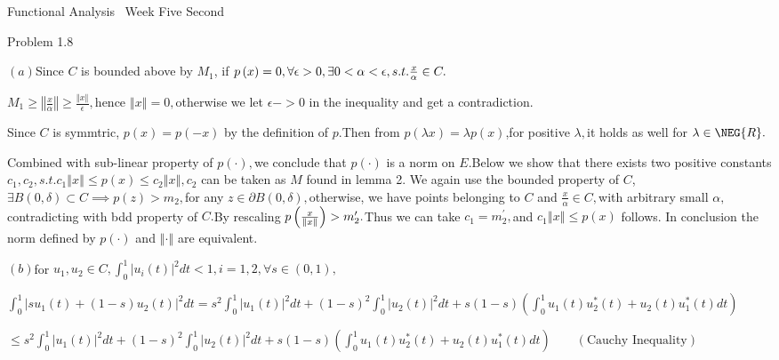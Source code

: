 \documentclass{article}
\begin{document}
\bigskip Functional Analysis \ Week Five Second

Problem 1.8

$\left( a\right) $Since $C$ is bounded above by $M_{1}$, if $p\left(
x\right) =0,\forall \epsilon >0,\exists 0<\alpha <\epsilon ,s.t.\frac{x}{%
\alpha }\in C.$

$M_{1}\geq \left\Vert \frac{x}{\alpha }\right\Vert \geq \frac{\left\Vert
x\right\Vert }{\epsilon },$hence $\left\Vert x\right\Vert =0,$otherwise we
let $\epsilon ->0$ in the inequality and get a contradiction.

Since $C$ is symmtric, $p\left( x\right) =p\left( -x\right) $ by the
definition of $p.$Then from $p\left( \lambda x\right) =\lambda p\left(
x\right) $,for positive $\lambda ,$it holds as well for $\lambda \in \NEG{R}.
$

Combined with sub-linear property of $p\left( \cdot \right) ,$we conclude
that $p\left( \cdot \right) $ is a norm on $E.$Below we show that there
exists two positive constants $c_{1},c_{2},s.t.c_{1}\left\Vert x\right\Vert
\leq p\left( x\right) \leq c_{2}\left\Vert x\right\Vert ,c_{2}$ can be taken
as $M$ found in lemma 2. We again use the bounded property of $C$, $\exists
B\left( 0,\delta \right) \subset C\implies p\left( z\right) >m_{2},$for any $%
z\in \partial B\left( 0,\delta \right) ,$otherwise, we have points belonging
to $C$ and $\frac{x}{\alpha }\in C,$with arbitrary small $\alpha ,$%
contradicting with bdd property of $C.$By rescaling $p\left( \frac{x}{%
\left\Vert x\right\Vert }\right) >m_{2}^{\prime }.$Thus we can take $%
c_{1}=m_{2}^{\prime },$and $c_{1}\left\Vert x\right\Vert \leq p\left(
x\right) $ follows. In conclusion the norm defined by $p\left( \cdot \right) 
$ and $\left\Vert \cdot \right\Vert $ are equivalent.

$\left( b\right) $for $u_{1},u_{2}\in C,\int_{0}^{1}\left\vert u_{i}\left(
t\right) \right\vert ^{2}dt<1,i=1,2,\forall s\in \left( 0,1\right) ,$

$\int_{0}^{1}\left\vert su_{1}\left( t\right) +\left( 1-s\right) u_{2}\left(
t\right) \right\vert ^{2}dt=s^{2}\int_{0}^{1}\left\vert u_{1}\left( t\right)
\right\vert ^{2}dt+\left( 1-s\right) ^{2}\int_{0}^{1}\left\vert u_{2}\left(
t\right) \right\vert ^{2}dt+s\left( 1-s\right) \left(
\int_{0}^{1}u_{1}\left( t\right) u_{2}^{\ast }\left( t\right) +u_{2}\left(
t\right) u_{1}^{\ast }\left( t\right) dt\right) $

$\leq s^{2}\int_{0}^{1}\left\vert u_{1}\left( t\right) \right\vert
^{2}dt+\left( 1-s\right) ^{2}\int_{0}^{1}\left\vert u_{2}\left( t\right)
\right\vert ^{2}dt+s\left( 1-s\right) \left( \int_{0}^{1}u_{1}\left(
t\right) u_{2}^{\ast }\left( t\right) +u_{2}\left( t\right) u_{1}^{\ast
}\left( t\right) dt\right) \qquad \left( \text{Cauchy Inequality}\right) $
\end{document}
